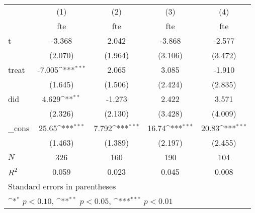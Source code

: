 {
\def\sym#1{\ifmmode^{#1}\else\(^{#1}\)\fi}
\begin{tabular}{l*{4}{c}}
\hline\hline
            &\multicolumn{1}{c}{(1)}&\multicolumn{1}{c}{(2)}&\multicolumn{1}{c}{(3)}&\multicolumn{1}{c}{(4)}\\
            &\multicolumn{1}{c}{fte}&\multicolumn{1}{c}{fte}&\multicolumn{1}{c}{fte}&\multicolumn{1}{c}{fte}\\
\hline
t           &      -3.368         &       2.042         &      -3.868         &      -2.577         \\
            &     (2.070)         &     (1.964)         &     (3.106)         &     (3.472)         \\
[1em]
treat       &      -7.005\sym{***}&       2.065         &       3.085         &      -1.910         \\
            &     (1.645)         &     (1.506)         &     (2.424)         &     (2.835)         \\
[1em]
did         &       4.629\sym{**} &      -1.273         &       2.422         &       3.571         \\
            &     (2.326)         &     (2.130)         &     (3.428)         &     (4.009)         \\
[1em]
\_cons      &       25.65\sym{***}&       7.792\sym{***}&       16.74\sym{***}&       20.83\sym{***}\\
            &     (1.463)         &     (1.389)         &     (2.197)         &     (2.455)         \\
\hline
\(N\)       &         326         &         160         &         190         &         104         \\
\(R^{2}\)   &       0.059         &       0.023         &       0.045         &       0.008         \\
\hline\hline
\multicolumn{5}{l}{\footnotesize Standard errors in parentheses}\\
\multicolumn{5}{l}{\footnotesize \sym{*} \(p<0.10\), \sym{**} \(p<0.05\), \sym{***} \(p<0.01\)}\\
\end{tabular}
}
